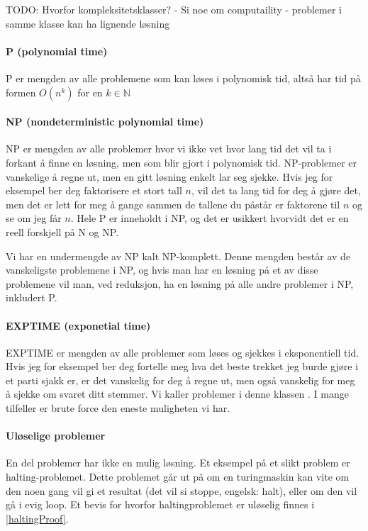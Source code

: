 {\color{red}TODO:}
Hvorfor kompleksitetsklasser?
- Si noe om computaility
- problemer i samme klasse kan ha lignende løsning



\paragraph{P (polynomial time)}
P er mengden av alle problemene som kan løses i polynomisk tid, altså har tid på formen $ O(n^k) $ for en $ k \in \mathbb{N} $

\paragraph{NP (nondeterministic polynomial time)}
NP er mengden av alle problemer hvor vi ikke vet hvor lang tid det vil ta i forkant å finne en løsning, men som blir gjort i polynomisk tid. NP-problemer er vanskelige å regne ut, men en gitt løsning enkelt lar seg sjekke. Hvis jeg for eksempel ber deg faktorisere et stort tall $ n $, vil det ta lang tid for deg å gjøre det, men det er lett for meg å gange sammen de tallene du påstår er faktorene til $ n $ og se om jeg får $ n $. Hele P er inneholdt i NP, og det er usikkert hvorvidt det er en reell forskjell på N og NP.

Vi har en undermengde av NP kalt NP-komplett. Denne mengden består av de vanskeligste problemene i NP, og hvis man har en løsning på et av disse problemene vil man, ved reduksjon, ha en løsning på alle andre problemer i NP, inkludert P.

\paragraph{EXPTIME (exponetial time)}
EXPTIME er mengden av alle problemer som løses og sjekkes i eksponentiell tid. Hvis jeg for eksempel ber deg fortelle meg hva det beste trekket jeg burde gjøre i et parti sjakk er, er det vanskelig for deg å regne ut, men også vanskelig for meg å sjekke om svaret ditt stemmer. Vi kaller problemer i denne klassen . I mange tilfeller er brute force den eneste muligheten vi har. 

\paragraph{Uløselige problemer} 
En del problemer har ikke en mulig løsning. Et eksempel på et slikt problem er halting-problemet. Dette problemet går ut på om en turingmaskin kan vite om den noen gang vil gi et resultat (det vil si stoppe, engelsk: halt), eller om den vil gå i evig loop. Et bevis for hvorfor haltingproblemet er uløselig finnes i \ref{haltingProof}. 


